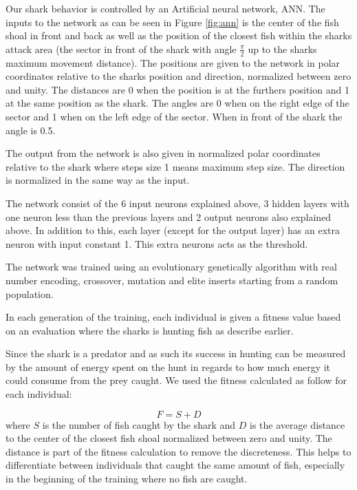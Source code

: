 Our shark behavior is controlled by an Artificial neural network, ANN. The inputs to the network as can be seen in Figure \ref{fig:ann} is the center of the fish shoal in front and back as well as the position of the closest fish within the sharks attack area (the sector in front of the shark with angle $\frac{\pi}{2}$ up to the sharks maximum movement distance). The positions are given to the network in polar coordinates relative to the sharks position and direction, normalized between zero and unity. The distances are 0 when the position is at the furthers position and 1 at the same position as the shark. The angles are 0 when on the right edge of the sector and 1 when on the left edge of the sector. When in front of the shark the angle is 0.5.

The output from the network is also given in normalized polar coordinates relative to the shark where steps size 1 means maximum step size. The direction is normalized in the same way as the input.

The network consist of the 6 input neurons explained above, 3 hidden layers with one neuron less than the previous layers and 2 output neurons also explained above. In addition to this, each layer (except for the output layer) has an extra neuron with input constant 1. This extra neurons acts as the threshold.

The network was trained using an evolutionary genetically algorithm with real number encoding, crossover, mutation and elite inserts starting from a random population.

In each generation of the training, each individual is given a fitness value based on an evaluation where the sharks is hunting fish as describe earlier.

Since the shark is a predator and as such its success in hunting can be measured by the amount of energy spent on the hunt in regards to how much energy it could consume from the prey caught. We used the fitness calculated as follow for each individual:

\begin{equation}
  F = S+D\label{eq:fitness}
\end{equation}
where $S$ is the number of fish caught by the shark and $D$ is the average distance to the center of the closest fish shoal normalized between zero and unity. The distance is part of the fitness calculation to remove the discreteness. This helps to differentiate between individuals that caught the same amount of fish, especially in the beginning of the training where no fish are caught.

